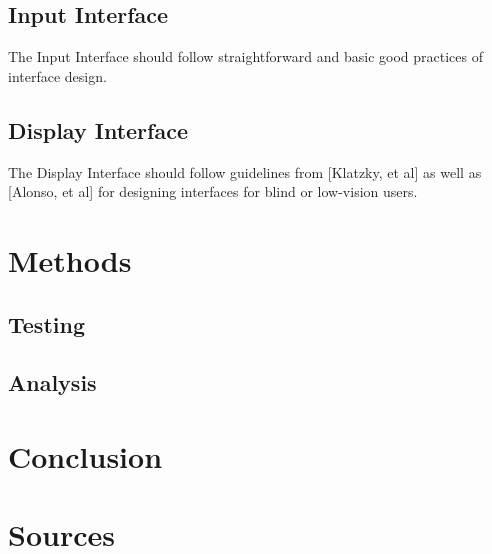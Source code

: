 \documentclass[]{article}
\begin{document}
\subsection{Input Interface}
The Input Interface should follow straightforward and basic good practices of interface design.

\subsection{Display Interface}
The Display Interface should follow guidelines from [Klatzky, et al] as well as [Alonso, et al] for designing interfaces for blind or low-vision users.

\section{Methods}
\subsection{Testing}

\subsection{Analysis}

\section{Conclusion}

\section{Sources}
\end{document}
